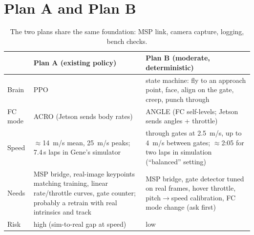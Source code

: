 \documentclass[10pt,a4paper]{article}
\newcommand{\code}[1]{\texttt{\detokenize{#1}}}
\begin{document}
\section{Plan A and Plan B}
\begin{table}[H]\centering\small
\begin{tabularx}{\linewidth}{@{}lXX@{}}
\toprule
& Plan A (existing policy) & Plan B (moderate, deterministic) \\
\midrule
Brain & \code{pq_speed_best} PPO & state machine: fly to an approach point, face, align on the gate, creep, punch through \\
FC mode & ACRO (Jetson sends body rates) & ANGLE (FC self-levels; Jetson sends angles + throttle) \\
Speed & $\approx$\SI{14}{m/s} mean, \SI{25}{m/s} peaks; 7.4\,s laps in Gene's simulator & through gates at \SI{2.5}{m/s}, up to \SI{4}{m/s} between gates; $\approx$2:05 for two laps in simulation (``balanced'' setting) \\
Needs & MSP bridge, real-image keypoints matching training, linear rate/throttle curves, gate counter; probably a retrain with real intrinsics and track & MSP bridge, gate detector tuned on real frames, hover throttle, pitch$\rightarrow$speed calibration, FC mode change (ask first) \\
Risk & high (sim-to-real gap at speed) & low \\
\bottomrule
\end{tabularx}
\caption{The two plans share the same foundation: MSP link, camera capture, logging, bench checks.}
\end{table}
\end{document}
